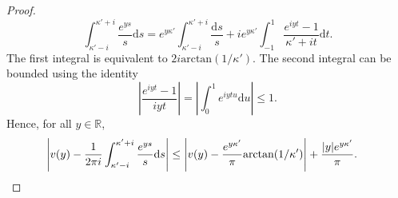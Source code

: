 \documentclass[reqno]{amsart}
\numberwithin{equation}{section}
\theoremstyle{remark}
\begin{document}
\begin{proof}
\begin{equation*}
    \int_{\kappa'-i}^{\kappa'+i} \frac{e^{ys}}{s}\mathrm{d}s = e^{y\kappa'} \int_{\kappa'-i}^{\kappa'+i} \frac{\mathrm{d}s}{s} + i e^{y\kappa'}\int_{-1}^1 \frac{e^{iyt}-1}{\kappa'+it}\mathrm{d}t.
\end{equation*}
The first integral is equivalent to $2i\text{arctan}(1/\kappa')$. The second integral can be bounded using the identity
\begin{equation*}
    \left| \frac{e^{iyt}-1}{iyt} \right| = \left| \int_{0}^1 e^{iytu} \mathrm{d}u \right| \leq 1.
\end{equation*}
Hence, for all $y\in\mathbb{R}$,
\begin{align*}
    \left| v(y) - \frac{1}{2\pi i} \int_{\kappa'-i}^{\kappa'+i} \frac{e^{ys}}{s}\mathrm{d}s \right| &\leq \left| v(y) - \frac{e^{y\kappa'}}{\pi} \text{arctan}(1/\kappa') \right| + \frac{|y|e^{y\kappa'}}{\pi}.\qedhere
\end{align*}
\end{proof}
\end{document}
